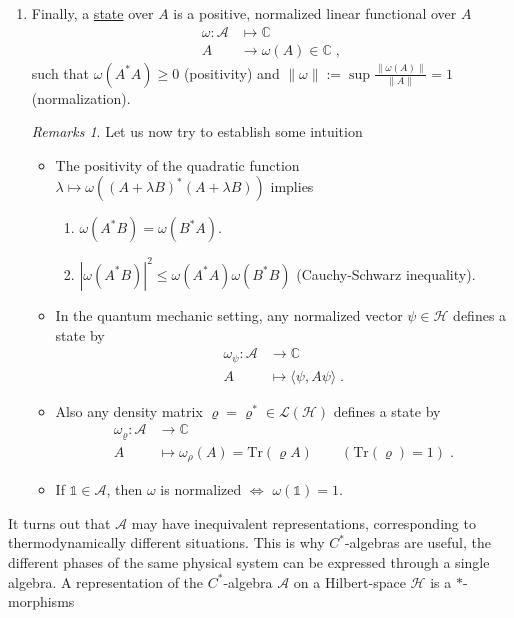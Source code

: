 \documentclass[
a4paper, %
11pt, %
onecolumn, %
openany, %
]{memoir}
\theoremstyle{definition}
\theoremstyle{remark}
\newtheorem{remarks}[definition]{Remarks}
\theoremstyle{plain}
\begin{document}
\begin{enumerate}
\begin{remarks}
\end{remarks}
\item Finally, a \underline{state} over $A$ is a positive, normalized linear functional over $A$ \begin{align*}
\omega:\mathcal{A}&\longmapsto \mathbb{C}\\
A&\longrightarrow \omega(A)\in\mathbb{C}\; ,
\end{align*}
such that $\omega(A^*A)\geq 0$ (positivity) and $\|\omega \| :=\sup \frac{\|\omega(A)\|}{\|A\|}=1$ (normalization).
\begin{remarks}
	Let us now try to establish some intuition \begin{itemize}
		\item The positivity of the quadratic function $\lambda\mapsto \omega((A+\lambda B)^*(A+\lambda B))$ implies 
		\begin{enumerate}
			\item $\omega(A^*B)=\omega(B^*A)$.
			\item $|\omega(A^*B)|^2\leq \omega(A^*A)\omega(B^*B)$ (Cauchy-Schwarz inequality).
		\end{enumerate}
		\item In the quantum mechanic setting, any normalized vector $\psi\in\mathcal{H}$ defines a state by \begin{align}\omega_{\psi}:\mathcal{A}&\longrightarrow \mathbb{C}\\
		A&\longmapsto \langle \psi, A\psi\rangle \; .\end{align}
		\item Also any density matrix $\varrho = \varrho^*\in \mathcal{L}(\mathcal{H})$ defines a state by \begin{align}
		\omega_{\varrho}:\mathcal{A}&\longrightarrow \mathbb{C}\\
		A&\longmapsto \omega_{\rho}(A)=\mathrm{Tr}(\varrho A) \qquad (\mathrm{Tr}(\varrho)=1) \; .
		\end{align}
		\item If $\mathds{1}\in\mathcal{A}$, then $\omega$ is normalized $\Leftrightarrow$ $\omega(\mathds{1})=1$.
		\end{itemize}
\end{remarks}
\end{enumerate}
It turns out that $\mathcal{A}$ may have inequivalent representations, corresponding to thermodynamically different situations. This is why $C^*$-algebras are useful, the different phases of the same physical system can be expressed through a single algebra. A representation of the $C^*$-algebra $\mathcal{A}$ on a Hilbert-space $\mathcal{H}$ is a $*$-morphisms
\end{document}
